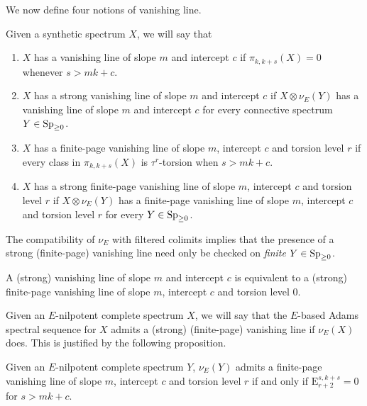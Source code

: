 We now define four notions of vanishing line.

\begin{dfn}
  Given a synthetic spectrum $X$, we will say that
  \begin{enumerate}
  \item $X$ has a vanishing line of slope $m$ and intercept $c$
    if $\pi_{k,k+s}(X) = 0$ whenever $s > mk+c$.
  \item $X$ has a strong vanishing line of slope $m$ and intercept $c$
    if $X \otimes \nu_E (Y)$ has a vanishing line of slope $m$ and intercept $c$ for every connective spectrum $Y \in \operatorname{\mathrm{Sp}}_{\geq 0}$.
  \item $X$ has a finite-page vanishing line of slope $m$, intercept $c$ and torsion level $r$ 
    if every class in $\pi_{k,k+s}(X)$ is $\tau^r$-torsion when $s > mk+c$.
  \item $X$ has a strong finite-page vanishing line of slope $m$, intercept $c$ and torsion level $r$
    if $X \otimes \nu_E (Y)$ has a finite-page vanishing line of slope $m$, intercept $c$ and torsion level $r$ for every $Y \in \operatorname{\mathrm{Sp}}_{\geq 0}$.
  \end{enumerate}
\end{dfn}

\begin{rmk}
    The compatibility of $\nu_E$ with filtered colimits implies that the presence of a strong (finite-page) vanishing line need only be checked on \emph{finite} $Y \in \operatorname{\mathrm{Sp}}_{\geq 0}$.

\end{rmk}

\begin{rmk}
  \label{rmk:strict-as-pc}
  A (strong) vanishing line of slope $m$ and intercept $c$ is equivalent to a (strong) finite-page vanishing line of slope $m$, intercept $c$ and torsion level $0$.
\end{rmk}

\begin{rmk}
    Given an $E$-nilpotent complete spectrum $X$, we will say that the $E$-based Adams spectral sequence for $X$ admits a (strong) (finite-page) vanishing line if $\nu_E (X)$ does. This is justified by the following proposition.
\end{rmk}

\begin{prop}\label{prop:vanishing-line-Adams}
    Given an $E$-nilpotent complete spectrum $Y$, $\nu_E (Y)$ admits a finite-page vanishing line of slope $m$, intercept $c$ and torsion level $r$ if and only if $\mathrm{E}^{s,k+s} _{r+2} = 0$ for $s > mk+c$.
\end{prop}

